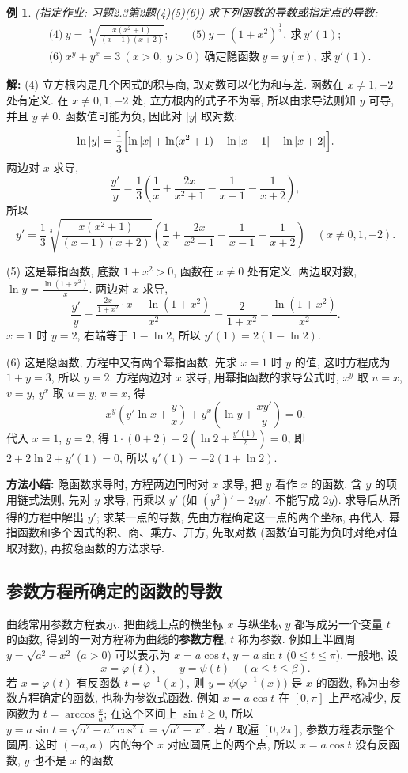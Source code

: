 \documentclass[UTF8,openany]{ctexbook}
\theoremstyle{chinesetextbook}
\newtheorem{example}{例}[section]
\newenvironment{cnsolution}{\par\indent\textbf{解:} \ignorespaces}{\par}
\begin{document}
\begin{example}\label{ex:c2-h3-2}
\textnormal{(指定作业: 习题2.3第2题(4)(5)(6))} 求下列函数的导数或指定点的导数:
\[
\begin{aligned}
&\text{(4)}\ y=\sqrt[3]{\frac{x(x^2+1)}{(x-1)(x+2)}};\qquad\text{(5)}\ y=(1+x^2)^{\frac1x},\ \text{求}\ y'(1);\\
&\text{(6)}\ x^y+y^x=3\ (x>0,\ y>0)\ \text{确定隐函数}\ y=y(x),\ \text{求}\ y'(1).
\end{aligned}
\]
\end{example}
\begin{cnsolution}
(4) 立方根内是几个因式的积与商, 取对数可以化为和与差. 函数在 $x\ne1,-2$ 处有定义. 在 $x\ne0,1,-2$ 处, 立方根内的式子不为零, 所以由求导法则知 $y$ 可导, 并且 $y\ne0$. 函数值可能为负, 因此对 $|y|$ 取对数:
\[
\ln|y|=\frac13\Bigl[\ln|x|+\ln(x^2+1)-\ln|x-1|-\ln|x+2|\Bigr].
\]
两边对 $x$ 求导,
\[
\frac{y'}y=\frac13\left(\frac1x+\frac{2x}{x^2+1}-\frac1{x-1}-\frac1{x+2}\right),
\]
所以
\[
y'=\frac13\sqrt[3]{\frac{x(x^2+1)}{(x-1)(x+2)}}\left(\frac1x+\frac{2x}{x^2+1}-\frac1{x-1}-\frac1{x+2}\right)\quad(x\ne0,1,-2).
\]

(5) 这是幂指函数, 底数 $1+x^2>0$, 函数在 $x\ne0$ 处有定义. 两边取对数, $\displaystyle\ln y=\frac{\ln(1+x^2)}x$. 两边对 $x$ 求导,
\[
\frac{y'}y=\frac{\frac{2x}{1+x^2}\cdot x-\ln(1+x^2)}{x^2}=\frac2{1+x^2}-\frac{\ln(1+x^2)}{x^2}.
\]
$x=1$ 时 $y=2$, 右端等于 $1-\ln2$, 所以 $y'(1)=2(1-\ln2)$.

(6) 这是隐函数, 方程中又有两个幂指函数. 先求 $x=1$ 时 $y$ 的值, 这时方程成为 $1+y=3$, 所以 $y=2$. 方程两边对 $x$ 求导, 用幂指函数的求导公式时, $x^y$ 取 $u=x$, $v=y$, $y^x$ 取 $u=y$, $v=x$, 得
\[
x^y\left(y'\ln x+\frac yx\right)+y^x\left(\ln y+\frac{xy'}y\right)=0.
\]
代入 $x=1$, $y=2$, 得 $\displaystyle1\cdot(0+2)+2\left(\ln2+\frac{y'(1)}2\right)=0$, 即 $2+2\ln2+y'(1)=0$, 所以 $y'(1)=-2(1+\ln2)$.
\end{cnsolution}
\par\indent\textbf{方法小结:} 隐函数求导时, 方程两边同时对 $x$ 求导, 把 $y$ 看作 $x$ 的函数. 含 $y$ 的项用链式法则, 先对 $y$ 求导, 再乘以 $y'$ (如 $(y^2)'=2yy'$, 不能写成 $2y$). 求导后从所得的方程中解出 $y'$; 求某一点的导数, 先由方程确定这一点的两个坐标, 再代入. 幂指函数和多个因式的积、商、乘方、开方, 先取对数 (函数值可能为负时对绝对值取对数), 再按隐函数的方法求导.
\subsection{参数方程所确定的函数的导数}
曲线常用参数方程表示. 把曲线上点的横坐标 $x$ 与纵坐标 $y$ 都写成另一个变量 $t$ 的函数, 得到的一对方程称为曲线的\textbf{参数方程}, $t$ 称为参数. 例如上半圆周 $y=\sqrt{a^2-x^2}$ ($a>0$) 可以表示为 $x=a\cos t$, $y=a\sin t$ ($0\le t\le\pi$). 一般地, 设
\[
x=\varphi(t),\qquad y=\psi(t)\quad(\alpha\le t\le\beta).
\]
若 $x=\varphi(t)$ 有反函数 $t=\varphi^{-1}(x)$, 则 $y=\psi\bigl(\varphi^{-1}(x)\bigr)$ 是 $x$ 的函数, 称为由参数方程确定的函数, 也称为参数式函数. 例如 $x=a\cos t$ 在 $[0,\pi]$ 上严格减少, 反函数为 $\displaystyle t=\arccos\frac xa$; 在这个区间上 $\sin t\ge0$, 所以 $y=a\sin t=\sqrt{a^2-a^2\cos^2t}=\sqrt{a^2-x^2}$. 若 $t$ 取遍 $[0,2\pi]$, 参数方程表示整个圆周. 这时 $(-a,a)$ 内的每个 $x$ 对应圆周上的两个点, 所以 $x=a\cos t$ 没有反函数, $y$ 也不是 $x$ 的函数.
\end{document}
